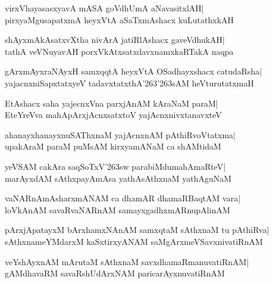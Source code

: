 \documentclass[twoside,12pt,openright]{book}
\def\S{\char'263}
\newcounter{shloka}[chapter]
\begin{document}
\begin{shloka}%
virxVhayasasxyavA mASA goVdhUmA aNavasitxlAH|\\
pirxyaMgusapatxmA heyxVtA aSaTxmAshacx kuLutathxkAH
\end{shloka}

\begin{shloka}%
shAyxmAkAsatxvXtha nivArA jatiRlAshacx gaveVdhukAH|\\
tathA veVNuyavAH porxVkAtxsatxdavxnamxkaRTakA naqpa
\end{shloka}

\begin{shloka}%
gArxmAyxraNAyxH samxqqtA heyxVtA OSadhayxshacx catudaRsha|\\
yajacnxniSapxtatxyeV tadavxtatxthA\S\S sAM heVturutatxmaH
\end{shloka}

\begin{shloka}%
EtAshacx saha yajecnxVna parxjAnAM kAraNaM paraM|\\
EteYreVva mahApArxjAcnxsatxtoV yajAcnxnivxtanavxteV
\end{shloka}

\begin{shloka}%
ahanayxhanayxnuSAThxnaM yajAcnxnAM pAthiRvoVtatxma|\\
upakAraM paraM puMsAM kirxyamANaM ca shAMtidaM
\end{shloka}

\begin{shloka}%
yeVSAM cakAra saqSoTxV\S sw parabiMdumahAmaRteV|\\
marAyxdAM sAthxpayAmAsa yathAsAthxnaM yathAguNaM
\end{shloka}

\begin{shloka}%
vaNARnAmAsharxmANAM ca dhamAR dhamaRBaqtAM vara|\\
loVkAnAM savaRvaNARnAM samayxgadhxmARnupAlinAM
\end{shloka}

\begin{shloka}%
pArxjApatayxM bArxhamxNAnAM samxqtaM sAthxnaM tu pAthiRva|\\
sAthxnameYMdarxM kaSxtirxyANAM saMgArxmeVSavxnivatiRnAM
\end{shloka}

\begin{shloka}%
veYshAyxnAM mArutaM sAthxnaM savxdhamaRmanuvatiRnAM|\\
gAMdhavaRM savaRshUdArxNAM paricarAyxnuvatiRnAM
\end{shloka}
\end{document}
